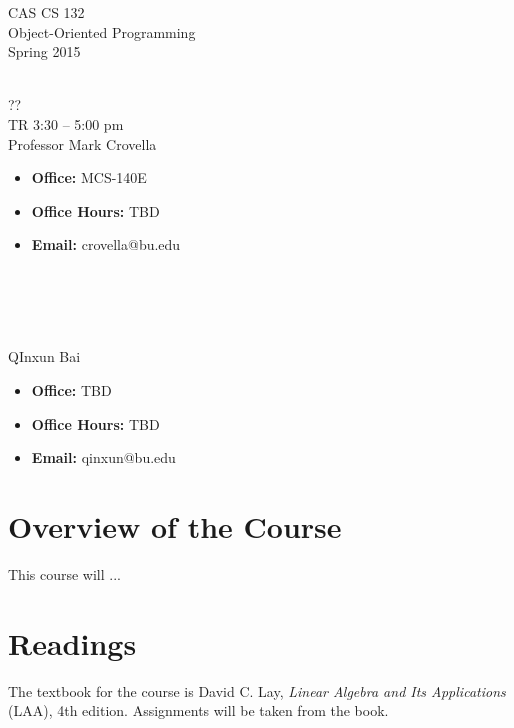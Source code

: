 \documentclass[11pt]{article}
\begin{document}
\begin{center}
\LARGE CAS CS 132\\
\Large Object-Oriented Programming\\
\Large\rm Spring 2015\\~\\
\end{center}

 ??\\[\baselineskip]
 TR 3:30 -- 5:00 pm 
\\[\baselineskip] 

 Professor Mark Crovella\\[0.75\baselineskip]
\begin{minipage}[t]{0.60\textwidth}
\begin{itemize}
\item {\bf Office:} MCS-140E
\item {\bf Office Hours:} {\small TBD}
\item {\bf Email:} crovella@bu.edu
\end{itemize}
\end{minipage}
~\\~\\~\\~\\
  QInxun Bai\\[0.75\baselineskip]
 \begin{minipage}[t]{0.60\textwidth}
 \begin{itemize}
 \item {\bf Office:} TBD
 \item {\bf Office Hours:} {\small TBD}
 \item {\bf Email:} qinxun@bu.edu
 \end{itemize}
 \end{minipage}

\section*{Overview of the Course}

This course will ...

\section*{Readings} 

The textbook for the course is David C. Lay, \emph{Linear Algebra and
  Its Applications} (LAA), 4th edition.    Assignments will be taken
from the book.
\end{document}
